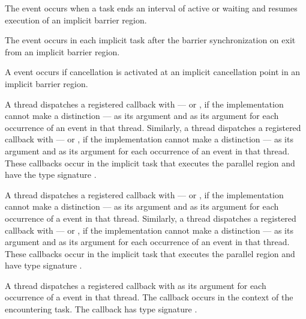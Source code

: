 The  event occurs when a task ends an interval of
active or waiting and resumes execution of an implicit barrier region.

The  event occurs in each implicit task after the
barrier synchronization on exit from an implicit barrier region.

A  event occurs if cancellation is activated at an
implicit cancellation point in an implicit barrier region.

\tools

A thread dispatches a registered 
callback with  --- or
, if the implementation cannot make a
distinction --- as its  argument and  
as its  argument for each occurrence of an  
event in that thread. Similarly, a thread dispatches a registered 
 callback with 
 --- or , 
if the implementation cannot make a distinction --- as its  argument 
and  as its  argument for each  occurrence 
of an  event in that thread. These callbacks occur in 
the implicit task that executes the parallel region and have the type signature 
.

A thread dispatches a registered  callback
with  --- or , 
if the implementation cannot make a distinction --- as its  argument and
 as its  argument for each occurrence of 
a  event in that thread. Similarly, a thread 
dispatches a registered  callback with 
 --- or , 
if the implementation cannot make a distinction --- as its  argument and
 as its  argument for each occurrence of an 
 event in that thread. These callbacks occur in 
the implicit task that executes the parallel region and have type signature 
.

A thread dispatches a registered  callback with 
 as its  argument for each occurrence 
of a  event in that thread. The callback occurs in the 
context of the encountering task. The callback has type signature
. 

